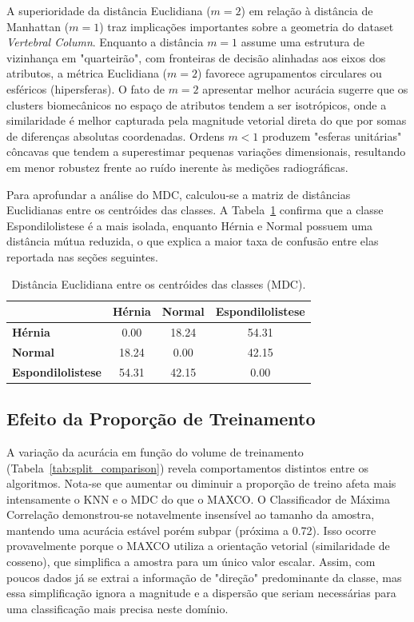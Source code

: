 A superioridade da distância Euclidiana ($m=2$) em relação à distância de Manhattan ($m=1$) traz implicações importantes sobre a geometria do dataset \textit{Vertebral Column}. Enquanto a distância $m=1$ assume uma estrutura de vizinhança em "quarteirão", com fronteiras de decisão alinhadas aos eixos dos atributos, a métrica Euclidiana ($m=2$) favorece agrupamentos circulares ou esféricos (hipersferas). O fato de $m=2$ apresentar melhor acurácia sugerre que os clusters biomecânicos no espaço de atributos tendem a ser isotrópicos, onde a similaridade é melhor capturada pela magnitude vetorial direta do que por somas de diferenças absolutas coordenadas. Ordens $m < 1$ produzem "esferas unitárias" côncavas que tendem a superestimar pequenas variações dimensionais, resultando em menor robustez frente ao ruído inerente às medições radiográficas.

Para aprofundar a análise do MDC, calculou-se a matriz de distâncias Euclidianas entre os centróides das classes. A Tabela~\ref{tab:mdc_distances} confirma que a classe Espondilolistese é a mais isolada, enquanto Hérnia e Normal possuem uma distância mútua reduzida, o que explica a maior taxa de confusão entre elas reportada nas seções seguintes.

\begin{table}[h!]
\centering
\caption{Distância Euclidiana entre os centróides das classes (MDC).}
\label{tab:mdc_distances}
\begin{tabular}{lccc}
\toprule
 & \textbf{Hérnia} & \textbf{Normal} & \textbf{Espondilolistese} \\
\midrule
\textbf{Hérnia} & 0.00 & 18.24 & 54.31 \\
\textbf{Normal} & 18.24 & 0.00 & 42.15 \\
\textbf{Espondilolistese} & 54.31 & 42.15 & 0.00 \\
\bottomrule
\end{tabular}
\end{table}

\subsection{Efeito da Proporção de Treinamento}
A variação da acurácia em função do volume de treinamento (Tabela~\ref{tab:split_comparison}) revela comportamentos distintos entre os algoritmos. Nota-se que aumentar ou diminuir a proporção de treino afeta mais intensamente o KNN e o MDC do que o MAXCO. O Classificador de Máxima Correlação demonstrou-se notavelmente insensível ao tamanho da amostra, mantendo uma acurácia estável porém subpar (próxima a 0.72). Isso ocorre provavelmente porque o MAXCO utiliza a orientação vetorial (similaridade de cosseno), que simplifica a amostra para um único valor escalar. Assim, com poucos dados já se extrai a informação de "direção" predominante da classe, mas essa simplificação ignora a magnitude e a dispersão que seriam necessárias para uma classificação mais precisa neste domínio.

